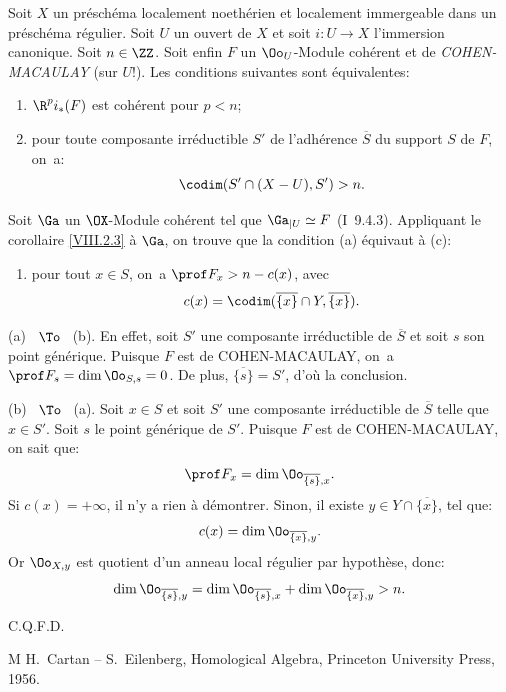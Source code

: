 \begin{proposition} \label{VIII.3.2} Soit $X$ un pr\'esch\'ema localement noeth\'erien et localement immergeable dans un pr\'esch\'ema r\'egulier. Soit $U$ un ouvert de $X$ et soit $i\colon U\to X$ l'immersion canonique. Soit $n\in\ZZ$. Soit enfin $F$ un $\Oo_U$-Module coh\'erent et de \emph{COHEN-MACAULAY} (sur $U$!). Les conditions suivantes sont \'equivalentes:
\begin{enumerate}
\item[(a)]
$\R^pi_\ast(F)$ est coh\'erent pour $p<n$;

\item[(b)]
pour toute composante irr\'eductible $S'$ de l'adh\'erence $\overline S$ du support $S$ de $F$, on~a:
\[
\codim (S'\cap (X-U), S')>n.
\]
\end{enumerate}
\end{proposition}

Soit ${\Ga}$ un $\OX$-Module coh\'erent tel que ${\Ga}{}_{|U}\simeq F$ (\EGA I~9.4.3). Appliquant le corollaire \ref{VIII.2.3} \`a ${\Ga}$, on trouve que la condition (a) \'equivaut \`a (c):
\begin{enumerate}
\item[(c)]
pour tout $x\in S$, on~a $\prof F_x>n-c(x)$, avec
\[c(x)=\codim(\overline{\{x\}}\cap Y, \overline{\{x\}}).
\]
\end{enumerate}

(a) ~$\To$~ (b). En effet, soit $S'$ une composante irr\'eductible de $\overline S$ et soit $s$ son point g\'en\'erique. Puisque $F$ est de COHEN-MACAULAY, on~a $\prof F_s=\dim \Oo_{S, s}=0$. De plus, $\overline{\{s\}}=S'$, d'o\`u la conclusion.

(b) ~$\To$~ (a). Soit $x\in S$ et soit $S'$ une composante irr\'eductible de $\overline{S}$ telle que $x\in S'$. Soit $s$ le point g\'en\'erique de $S'$. Puisque $F$ est de COHEN-MACAULAY, on sait que:
\[
\prof F_x=\dim \Oo_{\overline{\{s\}}, x}.
\]
Si $c(x)=+\infty$, il n'y a rien \`a d\'emontrer. Sinon, il existe $y\in Y\cap \overline{\{x\}}$, tel que:
\[c(x)=\dim \Oo_{\overline{\{x\}}, y}.
\]
Or $\Oo_{X, y}$ est quotient d'un anneau local r\'egulier par hypoth\`ese, donc:
\[
\dim \Oo_{\overline{\{s\}}, y}=\dim \Oo_{\overline{\{s\}}, x} +\dim \Oo_{\overline{\{x\}}, y}>n.
\]
\begin{flushright}C.Q.F.D.\end{flushright}

\begin{thebibliography}{M}
H.~Cartan -- S.~Eilenberg, Homological Algebra, Princeton University Press, 1956.
\end{thebibliography}

